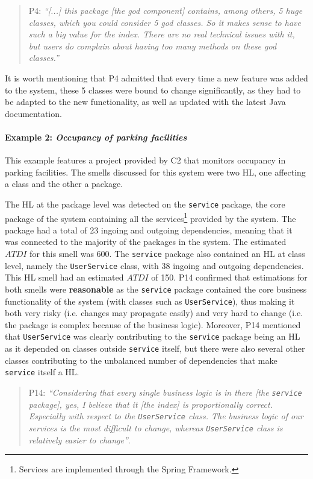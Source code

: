 \begin{quote}
    P4: \emph{``[...] this package [the god component] contains, among others, 5 huge classes, which you could consider 5 god classes. So it makes sense to have such a big value for the index.
    There are no real technical issues with it, but users do complain about having too many methods on these god classes.''}
\end{quote}

It is worth mentioning that P4 admitted that every time a new feature was added to the system, these 5 classes were bound to change significantly, as they had to be adapted to the new functionality, as well as updated with the latest Java documentation.

\paragraph{Example 2: \emph{Occupancy of parking facilities}}
This example features a project provided by C2 that monitors occupancy in parking facilities.
The smells discussed for this system were two HL, one affecting a class and the other a package.

The HL at the package level was detected on the \texttt{service} package, the core package of the system containing all the services\footnote{Services are implemented through the Spring Framework.} provided by the system.
The package had a total of 23 ingoing and outgoing dependencies, meaning that it was connected to the majority of the packages in the system.
The estimated $ATDI$ for this smell was $600$.
The \texttt{service} package also contained an HL at class level, namely the \texttt{UserService} class, with 38 ingoing and outgoing dependencies.
This HL smell had an estimated $ATDI$ of 150.
P14 confirmed that estimations for both smells were \textbf{reasonable} as the \texttt{service} package contained the core business functionality of the system (with classes such as \texttt{UserService}), thus making it both very risky (i.e. changes may propagate easily) and very hard to change (i.e. the package is complex because of the business logic).
Moreover, P14 mentioned that \texttt{UserService} was clearly contributing to the \texttt{service} package being an HL as it depended on classes outside \texttt{service} itself, but there were also several other classes contributing to the unbalanced number of dependencies that make \texttt{service} itself a HL.

\begin{quote}
    P14: \emph{``Considering that every single business logic is in there [the \texttt{service} package], yes, I believe that it [the index] is proportionally correct. Especially with respect to the \texttt{UserService} class. The business logic of our services is the most difficult to change, whereas \texttt{UserService} class is relatively easier to change''}.
\end{quote}

